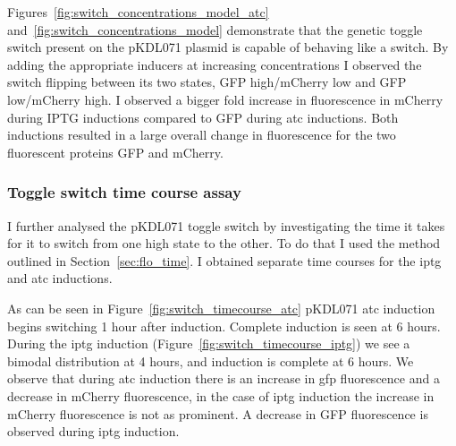 Figures~\ref{fig:switch_concentrations_model_atc} and~\ref{fig:switch_concentrations_model} demonstrate that the genetic toggle switch present on the pKDL071 plasmid is capable of behaving like a switch. By adding the appropriate inducers at increasing concentrations I observed the switch flipping between its two states, GFP high/mCherry low and GFP low/mCherry high. I observed a bigger fold increase in fluorescence in mCherry during IPTG inductions compared to GFP during \acrshort{atc} inductions. Both inductions resulted in a large overall change in fluorescence for the two fluorescent proteins GFP and mCherry. 


\subsubsection{Toggle switch time course assay}
\label{sec:ts_time}
I further analysed the pKDL071 toggle switch by investigating the time it takes for it to switch from one high state to the other. To do that I used the method outlined in Section~\ref{sec:flo_time}. I obtained separate time courses for the \acrshort{iptg} and \acrshort{atc} inductions. 

As can be seen in Figure~\ref{fig:switch_timecourse_atc} pKDL071 \acrshort{atc}  induction begins switching 1 hour after induction. Complete induction is seen at 6 hours. During the \acrshort{iptg} induction (Figure~\ref{fig:switch_timecourse_iptg}) we see a bimodal distribution at 4 hours, and induction is complete at 6 hours. We observe that during \acrshort{atc} induction there is an increase in \acrshort{gfp} fluorescence and a decrease in mCherry fluorescence, in the case of \acrshort{iptg} induction the increase in mCherry fluorescence is not as prominent. A decrease in GFP fluorescence is observed during \acrshort{iptg} induction. 


